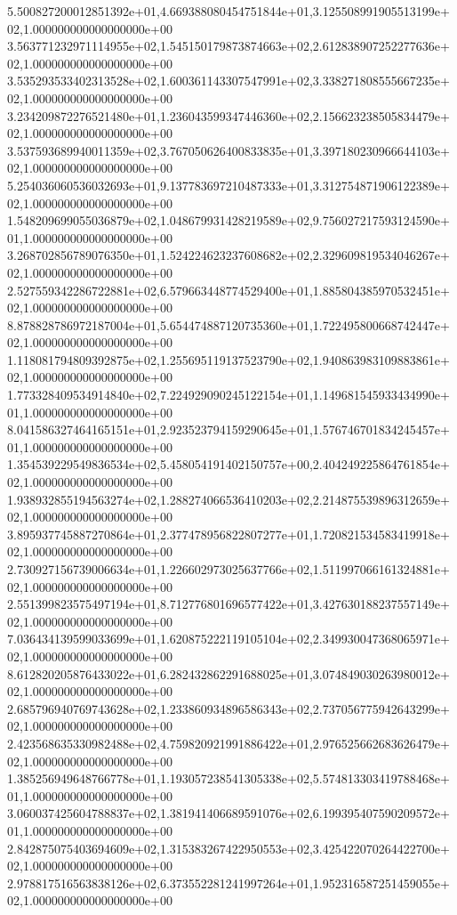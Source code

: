 5.500827200012851392e+01,4.669388080454751844e+01,3.125508991905513199e+02,1.000000000000000000e+00
3.563771232971114955e+02,1.545150179873874663e+02,2.612838907252277636e+02,1.000000000000000000e+00
3.535293533402313528e+02,1.600361143307547991e+02,3.338271808555667235e+02,1.000000000000000000e+00
3.234209872276521480e+01,1.236043599347446360e+02,2.156623238505834479e+02,1.000000000000000000e+00
3.537593689940011359e+02,3.767050626400833835e+01,3.397180230966644103e+02,1.000000000000000000e+00
5.254036060536032693e+01,9.137783697210487333e+01,3.312754871906122389e+02,1.000000000000000000e+00
1.548209699055036879e+02,1.048679931428219589e+02,9.756027217593124590e+01,1.000000000000000000e+00
3.268702856789076350e+01,1.524224623237608682e+02,2.329609819534046267e+02,1.000000000000000000e+00
2.527559342286722881e+02,6.579663448774529400e+01,1.885804385970532451e+02,1.000000000000000000e+00
8.878828786972187004e+01,5.654474887120735360e+01,1.722495800668742447e+02,1.000000000000000000e+00
1.118081794809392875e+02,1.255695119137523790e+02,1.940863983109883861e+02,1.000000000000000000e+00
1.773328409534914840e+02,7.224929090245122154e+01,1.149681545933434990e+01,1.000000000000000000e+00
8.041586327464165151e+01,2.923523794159290645e+01,1.576746701834245457e+01,1.000000000000000000e+00
1.354539229549836534e+02,5.458054191402150757e+00,2.404249225864761854e+02,1.000000000000000000e+00
1.938932855194563274e+02,1.288274066536410203e+02,2.214875539896312659e+02,1.000000000000000000e+00
3.895937745887270864e+01,2.377478956822807277e+01,1.720821534583419918e+02,1.000000000000000000e+00
2.730927156739006634e+01,1.226602973025637766e+02,1.511997066161324881e+02,1.000000000000000000e+00
2.551399823575497194e+01,8.712776801696577422e+01,3.427630188237557149e+02,1.000000000000000000e+00
7.036434139599033699e+01,1.620875222119105104e+02,2.349930047368065971e+02,1.000000000000000000e+00
8.612820205876433022e+01,6.282432862291688025e+01,3.074849030263980012e+02,1.000000000000000000e+00
2.685796940769743628e+02,1.233860934896586343e+02,2.737056775942643299e+02,1.000000000000000000e+00
2.423568635330982488e+02,4.759820921991886422e+01,2.976525662683626479e+02,1.000000000000000000e+00
1.385256949648766778e+01,1.193057238541305338e+02,5.574813303419788468e+01,1.000000000000000000e+00
3.060037425604788837e+02,1.381941406689591076e+02,6.199395407590209572e+01,1.000000000000000000e+00
2.842875075403694609e+02,1.315383267422950553e+02,3.425422070264422700e+02,1.000000000000000000e+00
2.978817516563838126e+02,6.373552281241997264e+01,1.952316587251459055e+02,1.000000000000000000e+00
